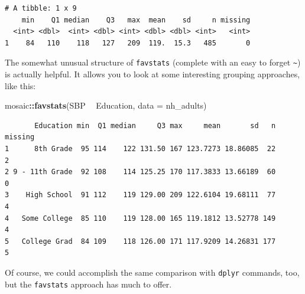 \documentclass[
]{book}
\newenvironment{Shaded}{\begin{snugshade}}{\end{snugshade}}
\newcommand{\DataTypeTok}[1]{\textcolor[rgb]{0.13,0.29,0.53}{#1}}
\newcommand{\FloatTok}[1]{\textcolor[rgb]{0.00,0.00,0.81}{#1}}
\newcommand{\KeywordTok}[1]{\textcolor[rgb]{0.13,0.29,0.53}{\textbf{#1}}}
\newcommand{\NormalTok}[1]{#1}
\newcommand{\OperatorTok}[1]{\textcolor[rgb]{0.81,0.36,0.00}{\textbf{#1}}}
\newcommand{\StringTok}[1]{\textcolor[rgb]{0.31,0.60,0.02}{#1}}
\begin{document}
\begin{verbatim}
# A tibble: 1 x 9
    min    Q1 median    Q3   max  mean    sd     n missing
  <int> <dbl>  <int> <dbl> <int> <dbl> <dbl> <int>   <int>
1    84   110    118   127   209  119.  15.3   485       0
\end{verbatim}

The somewhat unusual structure of \texttt{favstats} (complete with an easy to forget \texttt{\textasciitilde{}}) is actually helpful. It allows you to look at some interesting grouping approaches, like this:

\begin{Shaded}
\begin{Highlighting}[]
\NormalTok{mosaic}\OperatorTok{::}\KeywordTok{favstats}\NormalTok{(SBP }\OperatorTok{~}\StringTok{ }\NormalTok{Education, }\DataTypeTok{data =}\NormalTok{ nh_adults)}
\end{Highlighting}
\end{Shaded}

\begin{verbatim}
       Education min  Q1 median     Q3 max     mean       sd   n missing
1      8th Grade  95 114    122 131.50 167 123.7273 18.86085  22       2
2 9 - 11th Grade  92 108    114 125.25 170 117.3833 13.66189  60       0
3    High School  91 112    119 129.00 209 122.6104 19.68111  77       4
4   Some College  85 110    119 128.00 165 119.1812 13.52778 149       4
5   College Grad  84 109    118 126.00 171 117.9209 14.26831 177       5
\end{verbatim}

Of course, we could accomplish the same comparison with \texttt{dplyr} commands, too, but the \texttt{favstats} approach has much to offer.

\begin{Shaded}
\end{Shaded}
\end{document}
